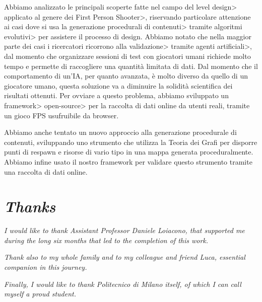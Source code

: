 \par

Abbiamo analizzato le principali scoperte fatte nel campo del \<level design> applicato al genere dei \<First Person Shooter>, riservando particolare attenzione ai casi dove si usa la \<generazione procedurali di contenuti> tramite \<algoritmi evolutivi> per assistere il processo di design. Abbiamo notato che nella maggior parte dei casi i ricercatori ricorrono alla \<validazione> tramite \<agenti artificiali>, dal momento che organizzare sessioni di test con giocatori umani richiede molto tempo e permette di raccogliere una quantità limitata di dati. Dal momento che il comportamento di un'IA, per quanto avanzata, è molto diverso da quello di un giocatore umano, questa soluzione va a diminuire la solidità scientifica dei risultati ottenuti. Per ovviare a questo problema, abbiamo sviluppato un \<framework> \<open-source> per la raccolta di dati online da utenti reali, tramite un gioco FPS usufruibile da browser.

\par

Abbiamo anche tentato un nuovo approccio alla generazione procedurale di contenuti, sviluppando uno strumento che utilizza la Teoria dei Grafi per disporre punti di respawn e risorse di vario tipo in una mappa generata proceduralmente. Abbiamo infine usato il nostro framework per validare questo strumento tramite una raccolta di dati online.

\chapter*{\textit{Thanks}}

\textit{I would like to thank Assistant Professor Daniele Loiacono, that supported me during the long six months that led to the completion of this work.}

\par \mbox{}

\textit{Thank also to my whole family and to my colleague and friend Luca, essential companion in this journey.}

\par \mbox{}

\textit{Finally, I would like to thank Politecnico di Milano itself, of which I can call myself a proud student.}

\par \mbox{}

\textit{}